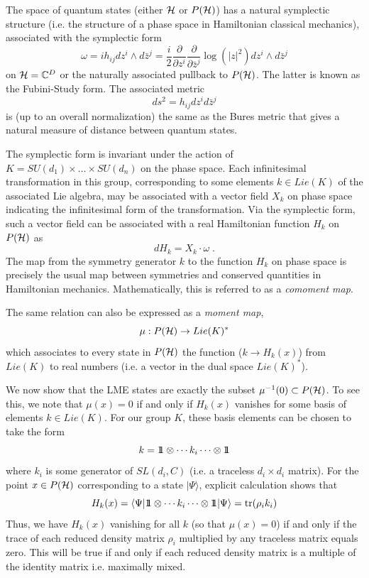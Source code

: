 \documentclass[12pt]{article}
\theoremstyle{definition}
\newcommand{\be}{\begin{equation}}
\newcommand{\ee}{\end{equation}}
\def\identity{{\rlap{1} \hskip 1.6pt \hbox{1}}}
\newcommand{\tr}{{\rm tr}}
\begin{document}
The space of quantum states (either ${\cal H}$ or $P({\cal H})$) has a natural symplectic structure (i.e. the structure of a phase space in Hamiltonian classical mechanics), associated with the symplectic form
\be
\omega = i h_{ij} dz^{i} \wedge  d\bar{z}^j =  \frac{i}{2} \frac{\partial}{\partial z^i} \frac{\partial}{\partial \bar{z}^j} \log (|z|^2) dz^{i} \wedge  d\bar{z}^j
\ee
on ${\cal H} = \mathbb{C}^D$ or the naturally associated pullback to $P({\cal H})$. The latter is known as the Fubini-Study form. The associated metric
\be
ds^2 = h_{ij} dz^i d \bar{z}^j
\ee
is (up to an overall normalization) the same as the Bures metric that gives a natural measure of distance between quantum states.

The symplectic form is invariant under the action of $K = SU(d_1) \times \dots \times SU(d_n)$ on the phase space. Each infinitesimal transformation  in this group, corresponding to some elements $k \in Lie(K)$ of the associated Lie algebra, may be associated with a vector field $X_k$ on phase space indicating the infinitesimal form of the transformation. Via the symplectic form, such a vector field can be associated with a real Hamiltonian function $H_k$ on $P({\cal H})$ as
\be
d H_k = {X_k} \cdot \omega \; .
\ee
The map from the symmetry generator $k$ to the function $H_k$ on phase space is precisely the usual map between symmetries and conserved quantities in Hamiltonian mechanics. Mathematically, this is referred to as a {\it comoment map}.

The same relation can also be expressed as a {\it moment map},
\be
\mu : P({\cal H}) \to Lie(K)^*
\ee
which associates to every state in $P({\cal H})$ the function ($k \to H_k(x)$) from $Lie(K)$ to real numbers (i.e. a vector in the dual space $Lie(K)^*$).

We now show that the LME states are exactly the subset $\mu^{-1}(0) \subset P({\cal H})$. To see this, we note that $\mu(x) = 0$ if and only if $H_k(x)$ vanishes for some basis of elements $k \in Lie(K)$. For our group $K$, these basis elements can be chosen to take the form
\be
k = \identity  \otimes \cdots k_i \cdots  \otimes \identity
\ee
where $k_i$ is some generator of $SL(d_i,C)$ (i.e. a traceless $d_i \times d_i$ matrix). For the point $x \in P({\cal H})$ corresponding to a state $|\Psi \rangle$, explicit calculation shows that
\be
H_k(x) = \langle \Psi| \identity  \otimes \cdots k_i \cdots  \otimes \identity | \Psi \rangle = \tr (\rho_i k_i)
\ee
Thus, we have $H_k(x)$ vanishing for all $k$ (so that $\mu(x)=0$) if and only if the trace of each reduced density matrix $\rho_i$ multiplied by any traceless matrix equals zero. This will be true if and only if each reduced density matrix is a multiple of the identity matrix i.e. maximally mixed.
\end{document}
